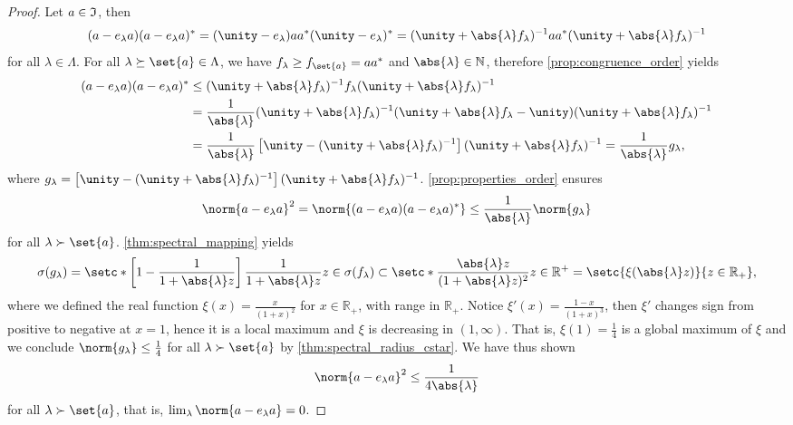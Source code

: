 \begin{proof}
    Let \(a \in \mathfrak{I}\), then
    \begin{equation*}
    (a - e_{\lambda}a)(a - e_{\lambda}a)^* = (\unity - e_{\lambda})a a^* (\unity - e_{\lambda})^* = (\unity + \abs{\lambda}f_{\lambda})^{-1}aa^* (\unity + \abs{\lambda}f_{\lambda})^{-1}
    \end{equation*}
    for all \(\lambda \in \Lambda\). For all \(\lambda \succeq \set{a} \in \Lambda\), we have \(f_{\lambda} \geq f_{\set{a}} = aa^*\) and \(\abs{\lambda} \in \mathbb{N}\), therefore \cref{prop:congruence_order} yields
    \begin{align*}
        (a - e_{\lambda}a)(a - e_{\lambda}a)^* &\leq (\unity + \abs{\lambda}f_{\lambda})^{-1} f_{\lambda} (\unity + \abs{\lambda}f_{\lambda})^{-1}\\
                                               &= \frac{1}{\abs{\lambda}} (\unity + \abs{\lambda}f_{\lambda})^{-1} (\unity + \abs{\lambda}f_{\lambda} - \unity) (\unity + \abs{\lambda}f_{\lambda})^{-1}\\
                                               &= \frac{1}{\abs{\lambda}} \left[\unity - (\unity + \abs{\lambda}f_{\lambda})^{-1}\right](\unity + \abs{\lambda}f_{\lambda})^{-1} = \frac{1}{\abs{\lambda}} g_{\lambda},
    \end{align*}
    where \(g_{\lambda} = \left[\unity - (\unity + \abs{\lambda}f_{\lambda})^{-1}\right](\unity + \abs{\lambda}f_{\lambda})^{-1}\). \cref{prop:properties_order} ensures
    \begin{equation*}
        \norm{a - e_{\lambda}a}^2 = \norm{(a - e_{\lambda}a)(a - e_{\lambda}a)^*} \leq \frac{1}{\abs{\lambda}} \norm{g_{\lambda}}
    \end{equation*}
    for all \(\lambda \succ \set{a}\). \cref{thm:spectral_mapping} yields
    \begin{equation*}
        \sigma(g_{\lambda}) = \setc*{\left[1 - \frac{1}{1 + \abs{\lambda}z}\right]\frac{1}{1 + \abs{\lambda}z}}{z \in \sigma(f_{\lambda})} \subset \setc*{\frac{\abs{\lambda}z}{(1 + \abs{\lambda}z)^2}}{z \in \mathbb{R}^+} = \setc{\xi(\abs{\lambda}z)}{z \in \mathbb{R}_+},
    \end{equation*}
    where we defined the real function \(\xi(x) = \frac{x}{(1 + x)^2}\) for \(x\in\mathbb{R}_+\), with range in \(\mathbb{R}_+\). Notice \(\xi'(x) = \frac{1 - x}{(1 + x)^3}\), then \(\xi'\) changes sign from positive to negative at \(x = 1\), hence it is a local maximum and \(\xi\) is decreasing in \((1, \infty)\). That is, \(\xi(1) = \frac14\) is a global maximum of \(\xi\) and we conclude \(\norm{g_{\lambda}} \leq \frac14\) for all \(\lambda \succ \set{a}\) by \cref{thm:spectral_radius_cstar}. We have thus shown
    \begin{equation*}
        \norm{a - e_{\lambda}a}^2 \leq \frac{1}{4\abs{\lambda}}
    \end{equation*}
    for all \(\lambda \succ \set{a}\), that is, \(\lim_{\lambda}\norm{a - e_{\lambda}a} = 0\).
\end{proof}
